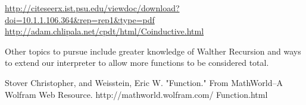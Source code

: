 \documentclass[12pt]{article}
\begin{document}
\url{http://citeseerx.ist.psu.edu/viewdoc/download?doi=10.1.1.106.364&rep=rep1&type=pdf}\\
\url{http://adam.chlipala.net/cpdt/html/Coinductive.html}

Other topics to pursue include greater knowledge of Walther Recursion and ways to extend our interpreter to allow more functions to be considered total.
\begin{thebibliography}{9}

Stover Christopher, and Weisstein, Eric W. "Function." From MathWorld--A Wolfram Web Resource. http://mathworld.wolfram.com/ Function.html

  

\end{thebibliography}
\end{document}
